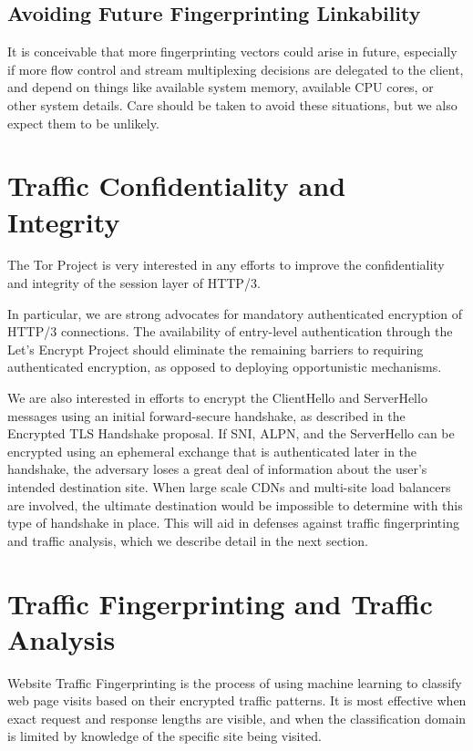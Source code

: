 \documentclass[letterpaper,11pt]{llncs}
\begin{document}
\subsection{Avoiding Future Fingerprinting Linkability}

It is conceivable that more fingerprinting vectors could arise in future,
especially if more flow control and stream multiplexing decisions are
delegated to the client, and depend on things like available system memory,
available CPU cores, or other system details. Care should be taken to avoid
these situations, but we also expect them to be unlikely.

\section{Traffic Confidentiality and Integrity}

The Tor Project is very interested in any efforts to improve the
confidentiality and integrity of the session layer of HTTP/3. 

In particular, we are strong advocates for mandatory authenticated encryption
of HTTP/3 connections.  The availability of entry-level authentication through
the Let's Encrypt Project should eliminate the remaining barriers to requiring
authenticated encryption, as opposed to deploying opportunistic mechanisms.

We are also interested in efforts to encrypt the ClientHello and ServerHello
messages using an initial forward-secure handshake, as described in the
Encrypted TLS Handshake proposal. If SNI, ALPN, and the ServerHello can be
encrypted using an ephemeral exchange that is authenticated later in the
handshake, the adversary loses a great deal of information about the user's
intended destination site. When large scale CDNs and multi-site load balancers
are involved, the ultimate destination would be impossible to determine with
this type of handshake in place. This will aid in defenses against traffic
fingerprinting and traffic analysis, which we describe detail in the next
section.

\section{Traffic Fingerprinting and Traffic Analysis}

Website Traffic Fingerprinting is the process of using machine learning to
classify web page visits based on their encrypted traffic patterns. It is most
effective when exact request and response lengths are visible, and when the
classification domain is limited by knowledge of the specific site being
visited.
\end{document}
